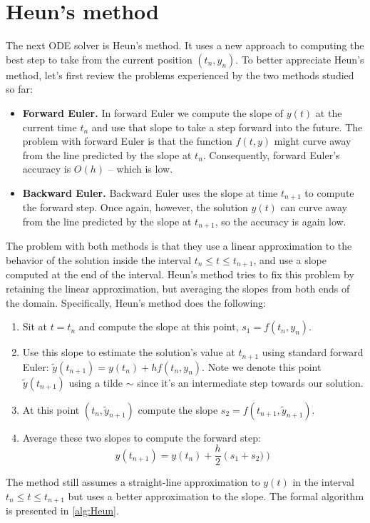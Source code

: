 \documentclass[hidelinks,notitlepage]{book}
\begin{document}
\section{Heun's method}
The next ODE solver is Heun's method.  It uses a new approach to computing the best step to take from the current position $(t_n, y_n)$.  To better appreciate Heun's method, let's first review the problems experienced by the two methods studied so far:
\begin{itemize}
	\item \textbf{Forward Euler.}  In forward Euler we compute the slope of $y(t)$ at the current time $t_n$ and use that slope to take a step forward into the future.  The problem with forward Euler is that the function $f(t, y)$ might curve away from the line predicted by the slope at $t_n$.  Consequently, forward Euler's accuracy is $O(h)$ -- which is low.
	\item \textbf{Backward Euler.}  Backward Euler uses the slope at time $t_{n+1}$ to compute the forward step.  Once again, however, the solution $y(t)$ can curve away from the line predicted by the slope at $t_{n+1}$, so the accuracy is again low.
\end{itemize}
The problem with both methods is that they use a linear approximation to the behavior of the solution inside the interval $t_n \le t \le t_{n+1}$, and use a slope computed at the end of the interval.  Heun's method tries to fix this problem by retaining the linear approximation, but averaging the slopes from both ends of the domain.  Specifically, Heun's method does the following:
\begin{enumerate}
	\item Sit at $t=t_n$ and compute the slope at this point, $s_1 = f(t_n, y_n)$.
	\item Use this slope to estimate the solution's value at $t_{n+1}$ using standard forward Euler:  $\tilde{y}(t_{n+1}) = y(t_n) + h f(t_n, y_n)$.  Note we denote this point $\tilde{y}(t_{n+1})$ using a tilde $\sim$ since it's an intermediate step towards our solution.
	\item At this point $(t_n, \tilde{y}_{n+1})$ compute the slope $s_2 = f(t_{n+1}, \tilde{y}_{n+1})$.
	\item Average these two slopes to compute the forward step:
	\begin{equation}
	 y(t_{n+1} ) = y(t_n) + \frac{h}{2} \left( s_1 + s_2 ) \right)
	\end{equation}
\end{enumerate}
The method still assumes a straight-line approximation to $y(t)$ in the interval $t_n \le t \le t_{n+1}$ but uses a better approximation to the slope. The formal algorithm is presented in \cref{alg:Heun}.
\end{document}
